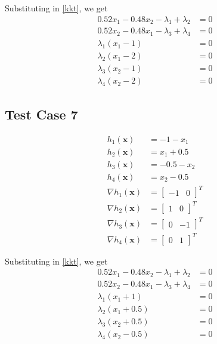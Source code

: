 \documentclass[a4paper]{article}
\begin{document}
Substituting in \eqref{kkt}, we get
\begin{align*}
0.52 x_1 - 0.48 x_2 - \lambda_1 + \lambda_2 &= 0 \\
0.52 x_2 - 0.48 x_1 - \lambda_3 + \lambda_4 &= 0 \\
\lambda_1 (x_1 - 1) &= 0 \\
\lambda_2 (x_1 - 2) &= 0 \\
\lambda_3 (x_2 - 1) &= 0 \\
\lambda_4 (x_2 - 2) &= 0
\end{align*}

\subsection{Test Case 7}

\begin{align*}
h_1(\textbf{x}) &= -1 - x_1 \\
h_2(\textbf{x}) &= x_1 + 0.5 \\
h_3(\textbf{x}) &= -0.5 - x_2 \\
h_4(\textbf{x}) &= x_2 - 0.5 \\
\nabla h_1(\textbf{x}) &= \begin{bmatrix} -1 & 0 \end{bmatrix} ^T \\
\nabla h_2(\textbf{x}) &= \begin{bmatrix} 1 & 0 \end{bmatrix} ^T \\
\nabla h_3(\textbf{x}) &= \begin{bmatrix} 0 & -1 \end{bmatrix} ^T \\
\nabla h_4(\textbf{x}) &= \begin{bmatrix} 0 & 1 \end{bmatrix} ^T
\end{align*}

Substituting in \eqref{kkt}, we get
\begin{align*}
0.52 x_1 - 0.48 x_2 - \lambda_1 + \lambda_2 &= 0 \\
0.52 x_2 - 0.48 x_1 - \lambda_3 + \lambda_4 &= 0 \\
\lambda_1 (x_1 + 1) &= 0 \\
\lambda_2 (x_1 + 0.5) &= 0 \\
\lambda_3 (x_2 + 0.5) &= 0 \\
\lambda_4 (x_2 - 0.5) &= 0
\end{align*}
\end{document}
